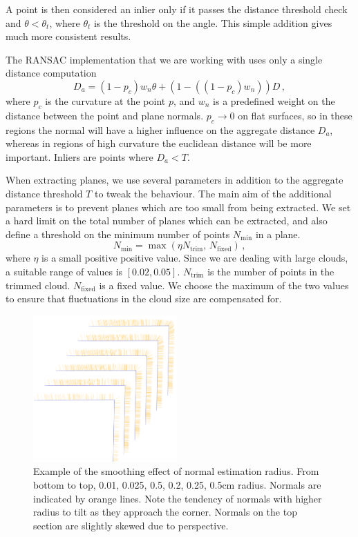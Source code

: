 \documentclass[11pt,a4paper]{kth-mag}
\begin{document}
A point is then considered an inlier only if it passes the distance threshold
check and $\theta<\theta_t$, where $\theta_t$ is the threshold on the angle.
This simple addition gives much more consistent results.

The RANSAC implementation that we are working with uses only a single distance
computation
\begin{equation}
  \label{eq:6}
  D_a=(1-p_c)w_n\theta + (1-((1-p_c)w_n))D\,,
\end{equation}
where $p_c$ is the curvature at the point $p$, and $w_n$ is a predefined weight
on the distance between the point and plane normals. $p_c\rightarrow 0$ on flat
surfaces, so in these regions the normal will have a higher influence on the
aggregate distance $D_a$, whereas in regions of high curvature the euclidean
distance will be more important. Inliers are points where $D_a<T$.

When extracting planes, we use several parameters in addition to the aggregate
distance threshold $T$ to tweak the behaviour. The main aim of the additional
parameters is to prevent planes which are too small from being extracted. We
set a hard limit on the total number of planes which can be extracted, and also
define a threshold on the minimum number of points $N_{\min}$ in a plane.
\begin{equation}
  \label{eq:7}
  N_{\min}=\max(\eta N_{\text{trim}},\, N_{\text{fixed}})\,,
\end{equation}
where $\eta$ is a small positive positive value. Since we are dealing with large
clouds, a suitable range of values is $\left[0.02,0.05\right]$.
$N_{\text{trim}}$ is the number of points in the trimmed cloud.
$N_{\text{fixed}}$ is a fixed value. We choose the maximum of the two values to
ensure that fluctuations in the cloud size are compensated for.
\newpage
\begin{figure}[H]
  \centering
  \includegraphics[width=0.49\textwidth]{images/normals_comb}
  \caption{Example of the smoothing effect of normal estimation radius. From
    bottom to top, 0.01, 0.025, 0.5, 0.2, 0.25, 0.5cm radius. Normals are
    indicated by orange lines. Note the tendency of normals with higher radius
    to tilt as they approach the corner. Normals on the top section are slightly
    skewed due to perspective.}
  \label{fig:normal_corner}
\end{figure}
\end{document}
